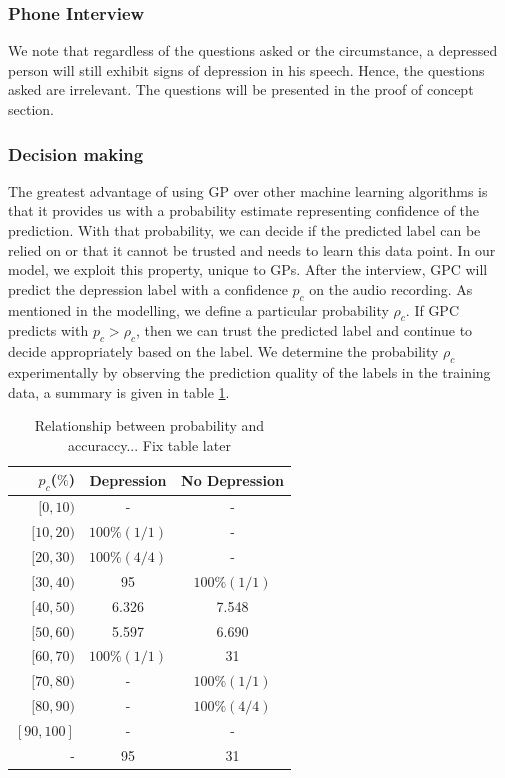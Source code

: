 \documentclass{article}
\begin{document}
	\subsubsection{Phone Interview}
	We note that regardless of the questions asked or the circumstance, a depressed person will still exhibit signs of depression in his speech\cite{jad2008}. Hence, the questions asked are irrelevant. The questions will be presented in the proof of concept section.

	\subsubsection{Decision making}
	The greatest advantage of using GP over other machine learning algorithms is that it provides us with a probability estimate representing confidence of the prediction. With that probability, we can decide if the predicted label can be relied on or that it cannot be trusted and needs to learn this data point. In our model, we exploit this property, unique to GPs. After the interview, GPC will predict the depression label with a confidence $p_c$ on the audio recording. As mentioned in the modelling, we define a particular probability $\rho_c$. If GPC predicts with $p_c>\rho_c$, then we can trust the predicted label and continue to decide appropriately based on the label. We determine the probability $\rho_c$ experimentally by observing the prediction quality of the labels in the training data, a summary is given in table \ref{tab:rho}.
	
 	\begin{table}[h]
 		\begin{center}
  			\begin{tabular}{ | r | c | c | }
    			\hline
			 	 \bfseries $p_c$($\%$)	& \bfseries Depression 	& \bfseries No Depression \\ \hline
				 $[0,10)$		& - 			& - 			 \\ \hline
				 $[10,20)$		& $100\%(1/1)$ 		& -		 \\ \hline
				 $[20,30)$		& $100\%(4/4)$ 		& - 	 \\ \hline
				 $[30,40)$		& 95 			& $100\%(1/1)$ 			 \\ \hline
				 $[40,50)$		& 6.326 		& 7.548		 \\ \hline
				 $[50,60)$		& 5.597 		& 6.690 	 \\ \hline 
				 $[60,70)$		& $100\%(1/1)$ 			& 31 			 \\ \hline
				 $[70,80)$		& - 		& $100\%(1/1)$		 \\ \hline
				 $[80,90)$		& - 		& $100\%(4/4)$ 	 \\ \hline 
				 $[90,100]$		& - 			& - 			 \\ \hline
				 -		& 95 			& 31 			 \\ \hline
			 \end{tabular}
		\end{center}
 	\caption{Relationship between probability and accuraccy... Fix table later}
 	\label{tab:rho}
 	\end{table}
\end{document}
